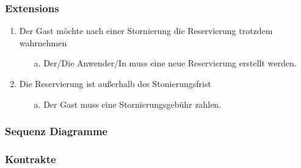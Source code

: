 \documentclass[./detailed_overview_usecases.tex]{subfiles}
\begin{document}
    \subsubsection*{Extensions}
    \begin{enumerate}
        \item Der Gast möchte nach einer Stornierung die Reservierung trotzdem wahrnehmen
        \begin{itemize}
            \item[a.] Der/Die Anwender/In muss eine neue Reservierung erstellt werden.
        \end{itemize}
        \item Die Reservierung ist außerhalb des Stonierungsfrist
        \begin{itemize}
            \item[a.] Der Gast muss eine Stornierungsgebühr zahlen.
        \end{itemize}
    \end{enumerate}

    \subsubsection{Sequenz Diagramme}
    \subsubsection{Kontrakte}
\end{document}
